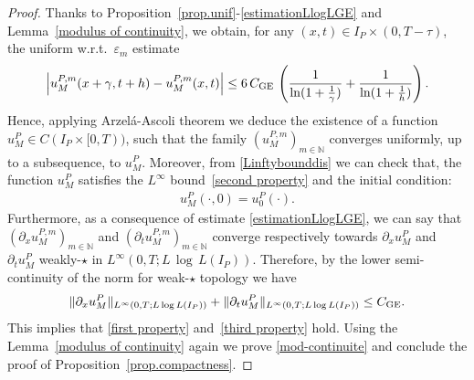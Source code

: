 \documentclass[11pt]{amsart}
\newcommand{\pa}{\partial}
\newcommand{\N}{\mathbb{N}}
\newcommand{\eps}{\varepsilon}
\begin{document}
\begin{proof}

Thanks to Proposition~\ref{prop.unif}-\eqref{estimationLlogLGE} and Lemma~\ref{modulus of continuity}, we obtain, for any $(x,t) \in I_P \times (0,T-\tau)$, the uniform w.r.t.~$\eps_m$ estimate
\begin{align}\label{mod.cont.dis}
    \left|u^{P,m}_M(x+\gamma,t+h)-u^{P,m}_M(x,t)\right| \leq 6\, {C}_{\rm GE} \, \left(\frac{1}{\ln(1+\frac{1}{\gamma})}+\frac{1}{\ln(1+\frac{1}{h})}\right).
\end{align}
Hence, applying Arzel\'a-Ascoli theorem we deduce the existence of a function $u^P_M \in C(I_P\times [0,T))$, such that the family $(u^{P,m}_M)_{m\in\N}$ converges uniformly, up to a subsequence, to $u^P_M$. Moreover, from \eqref{Linftybounddis} we can check that,  the function $u^P_M$ satisfies the $L^\infty$ bound~\eqref{second property} and the initial condition:
\begin{align*}
    u^P_M(\cdot,0) = u^P_0(\cdot).
\end{align*}
Furthermore, as a consequence of estimate \eqref{estimationLlogLGE}, we can say that 
$(\pa_x u^{P,m}_M)_{m\in\N}$ and $(\pa_t u^{P,m}_M)_{m\in\N}$ converge respectively towards 
$\pa_x u^{P}_M$ and $\pa_t u^{P}_M$ weakly-$\star$ in $L^\infty(0,T;L\,\log\,L(I_P))$. 
Therefore, by the lower semi-continuity of the norm for weak-$\star$  topology we have 
$$
   \|\partial_x u^P_M \|_{L^{\infty}(0, T; L \log L (I_P) )} + \|\partial_t u^P_M \|_{L^{\infty}(0, T; L \log L (I_P) )} \leq C_{\rm GE}.$$
   This implies that \eqref{first property} and~\eqref{third property} hold. 
Using the Lemma~\ref{modulus of continuity}  again we prove \eqref{mod-continuite} 
and conclude the proof of Proposition~\ref{prop.compactness}.
\end{proof}
\end{document}
